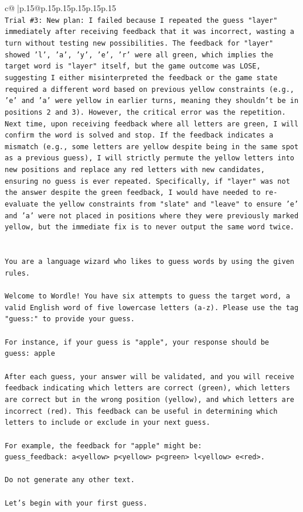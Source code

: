 \documentclass{article}
\begin{document}
{\begin{supertabular}{c@{$\;$}|p{.15\linewidth}@{}p{.15\linewidth}p{.15\linewidth}p{.15\linewidth}p{.15\linewidth}p{.15\linewidth}}
{{{\\ 
\texttt{Trial \#3: New plan: I failed because I repeated the guess "layer" immediately after receiving feedback that it was incorrect, wasting a turn without testing new possibilities. The feedback for "layer" showed 'l', 'a', 'y', 'e', 'r' were all green, which implies the target word is "layer" itself, but the game outcome was LOSE, suggesting I either misinterpreted the feedback or the game state required a different word based on previous yellow constraints (e.g., 'e' and 'a' were yellow in earlier turns, meaning they shouldn't be in positions 2 and 3). However, the critical error was the repetition. Next time, upon receiving feedback where all letters are green, I will confirm the word is solved and stop. If the feedback indicates a mismatch (e.g., some letters are yellow despite being in the same spot as a previous guess), I will strictly permute the yellow letters into new positions and replace any red letters with new candidates, ensuring no guess is ever repeated. Specifically, if "layer" was not the answer despite the green feedback, I would have needed to re{-}evaluate the yellow constraints from "slate" and "leave" to ensure 'e' and 'a' were not placed in positions where they were previously marked yellow, but the immediate fix is to never output the same word twice.} \\
\\ 
\\ 
\texttt{You are a language wizard who likes to guess words by using the given rules.} \\
\\ 
\texttt{Welcome to Wordle! You have six attempts to guess the target word, a valid English word of five lowercase letters (a{-}z). Please use the tag "guess:" to provide your guess.} \\
\\ 
\texttt{For instance, if your guess is "apple", your response should be} \\
\texttt{guess: apple} \\
\\ 
\texttt{After each guess, your answer will be validated, and you will receive feedback indicating which letters are correct (green), which letters are correct but in the wrong position (yellow), and which letters are incorrect (red). This feedback can be useful in determining which letters to include or exclude in your next guess.} \\
\\ 
\texttt{For example, the feedback for "apple" might be:} \\
\texttt{guess\_feedback: a<yellow> p<yellow> p<green> l<yellow> e<red>.} \\
\\ 
\texttt{Do not generate any other text.} \\
\\ 
\texttt{Let's begin with your first guess.} \\
            }
        }
    }
     \\ \\


\end{supertabular}}
\end{document}

